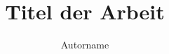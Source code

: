 \documentclass[fallstudie,grey]{mas-thesis}				%
\author{Autorname}
\title{Titel der Arbeit}
\begin{document}
\maketitle
\makelicensepageCCBYSA


% 
% 
% 
% 
% 
% 







% 







% 
\end{document}
